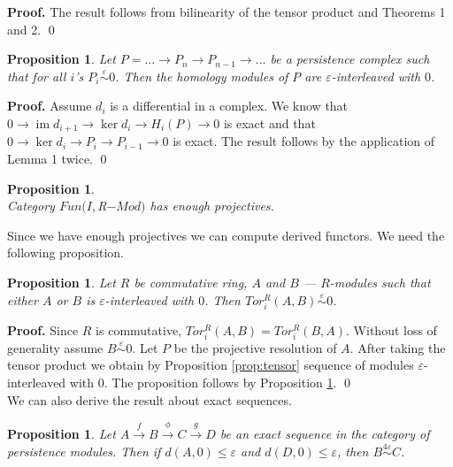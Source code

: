 \documentclass[english,12pt]{article}
\newcounter{stmcounter}[section]
\numberwithin{equation}{section}
\newtheorem{proposition}[stmcounter]{Proposition}
\theoremstyle{definition}
\theoremstyle{remark}
\newenvironment{pf}{\noindent\textbf{Proof.}}{\qed}
\renewcommand{\leq}{\leqslant}
\begin{document}
\begin{pf}
  The result follows from bilinearity of the tensor product and Theorems 1 and 2.
\end{pf}

\begin{proposition}
  \label{prop:hominter}
  Let $P = \ldots \to P_n \to P_{n-1} \to \ldots$ be a persistence complex such that for all $i$'s $P_i \stackrel{\varepsilon}{\sim} 0$. Then the homology modules of $P$ are $\varepsilon$-interleaved with $0$.
\end{proposition}

\begin{pf}
  Assume $d_i$ is a differential in a complex. We know that $0 \to \operatorname{im}{d_{i+1}} \to \ker{d_{i}} \to H_i(P) \to 0$ is exact and that $0 \to \ker{d_i} \to P_i \to P_{i-1} \to 0$ is exact. The result follows by the application of Lemma 1 twice.
\end{pf}\\

\begin{proposition} {\cite[Page 2]{Mitchell81}}\\
  Category $Fun(I, $R$-Mod)$ has enough projectives.
\end{proposition}

Since we have enough projectives we can compute derived functors. We need the following proposition.\\

\begin{proposition}
  \label{prop:tor}
  Let $R$ be commutative ring, $A$ and $B$ --- $R$-modules such that either $A$ or $B$ is $\varepsilon$-interleaved with $0$. Then $Tor_i^R(A,B) \stackrel{\varepsilon}{\sim} 0$.
\end{proposition}

\begin{pf}
  Since $R$ is commutative, $Tor_i^R(A,B) = Tor_i^R(B,A)$. Without loss of generality assume $B \stackrel{\varepsilon}{\sim} 0$. Let $P$ be the projective resolution of $A$. After taking the tensor product we obtain by Proposition \ref{prop:tensor} sequence of modules $\varepsilon$-interleaved with $0$. The proposition follows by Proposition \ref{prop:hominter}.
\end{pf}\\

We can also derive the result about exact sequences.\\

\begin{proposition}
  \label{major}
  Let $A \xrightarrow{f} B \xrightarrow{\phi} C \xrightarrow{g} D$ be an exact sequence in the category of persistence modules. Then if $d(A,0) \leq \varepsilon$ and $d(D,0) \leq \varepsilon$, then $B \stackrel{4\varepsilon}{\sim} C$.
\end{proposition}
\end{document}
